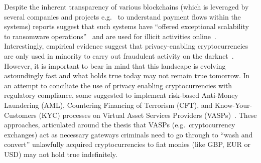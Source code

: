 \documentclass[runningheads,10pt]{llncs}
\numberwithin{equation}{section}
\begin{document}
Despite the inherent transparency of various blockchains (which is leveraged by
several companies and projects e.g.~\cite{elliptic-company,chainanalysis-company,bitcoin-abuse} to understand payment flows
within the systems) reports suggest that such systems have ``offered exceptional
scalability to ransomware operations''~\cite{tails-ransoms} and are used for
illicit activities online~\cite{analysis-darknet}.
%
Interestingly, empirical evidence suggest that privacy-enabling cryptocurrencies
are only used in minority to carry out fraudulent activity on the
darknet~\cite{RR-4418-ECC}. However, it is important to bear in mind that this
landscape is evolving astoundingly fast and what holds true today may not remain
true tomorrow. In an attempt to conciliate the use of privacy enabling
cryptocurrencies with regulatory compliance, some suggested to implement
risk-based Anti-Money Laundering (AML), Countering Financing of Terrorism (CFT),
and Know-Your-Customers (KYC) processes on Virtual Asset Services Providers
(VASPs)~\cite{perkinscoie_report,fatf-vasp}. These approaches, articulated
around the thesis that VASPs (e.g.~cryptocurrency exchanges) act as necessary
gateways criminals need to go through to ``wash and convert'' unlawfully
acquired cryptocurrencies to fiat monies (like GBP, EUR or USD) may not hold true indefinitely.
\end{document}

